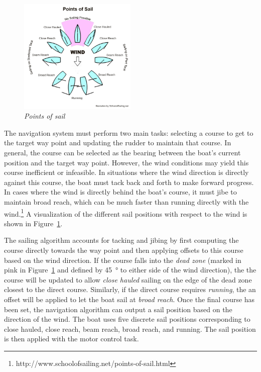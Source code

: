 \documentclass[12pt]{article}
\begin{document}
\begin{figure}
	\centering
	\includegraphics[width=0.5\textwidth]{figures/points_of_sail.jpg}
	\caption[Points of sail]{\textsl{Points of sail}}
	\label{fig:sail_pos}
\end{figure}

The navigation system must perform two main tasks: selecting a course to get to the target way point and updating the rudder to maintain that course. In general, the course can be selected as the bearing between the boat's current position and the target way point. However, the wind conditions may yield this course inefficient or infeasible. In situations where the wind direction is directly against this course, the boat must tack back and forth to make forward progress. In cases where the wind is directly behind the boat's course, it must jibe to maintain broad reach, which can be much faster than running directly with the wind.\footnote{http://www.schoolofsailing.net/points-of-sail.html} A visualization of the different sail positions with respect to the wind is shown in Figure~\ref{fig:sail_pos}.

The sailing algorithm accounts for tacking and jibing by first computing the course directly towards the way point and then applying offsets to this course based on the wind direction. If the course falls into the \textit{dead zone} (marked in pink in Figure~\ref{fig:sail_pos} and defined by \SI{45}{\degree} to either side of the wind direction), the the course will be updated to allow \textit{close hauled} sailing on the edge of the dead zone closest to the direct course. Similarly, if the direct course requires \textit{running}, the an offset will be applied to let the boat sail at \textit{broad reach}. Once the final course has been set, the navigation algorithm can output a sail position based on the direction of the wind. The boat uses five discrete sail positions corresponding to close hauled, close reach, beam reach, broad reach, and running. The sail position is then applied with the motor control task.
\end{document}
